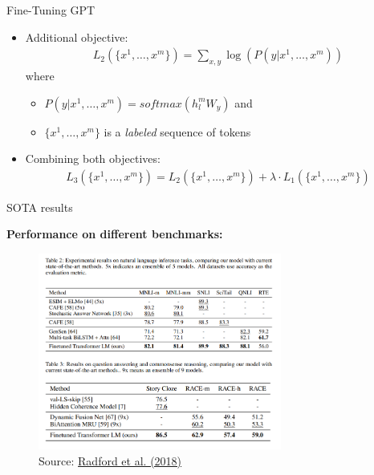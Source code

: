 
\begin{vbframe}{Fine-Tuning GPT}

\vfill

\begin{itemize}
		\item Additional objective:
					\begin{align*}
						L_2(\{x^1, \hdots, x^m\}) = \sum_{x,y} \log(P(y | x^1, \hdots, x^m))
					\end{align*}		
					where 
				\begin{itemize}
					\item $P(y | x^1, \hdots, x^m) = softmax(h_l^m W_y)$ and 
					\item $\{x^1, \hdots, x^m\}$ is a \textit{labeled} sequence of tokens
				\end{itemize}
		\item Combining both objectives: 
					\begin{align*}
						L_3(\{x^1, \hdots, x^m\}) = L_2(\{x^1, \hdots, x^m\}) + \lambda \cdot L_1(\{x^1, \hdots, x^m\})
					\end{align*}
\end{itemize}

\vfill

\end{vbframe}


\begin{vbframe}{SOTA results}

\vfill

	\textbf{Performance on different benchmarks:}

	\begin{figure}
		\centering
		\includegraphics[width = 8cm]{figure/gpt-sota.png}\\ 
		\footnotesize{Source:} \href{https://s3-us-west-2.amazonaws.com/openai-assets/research-covers/language-unsupervised/language_understanding_paper.pdf}{\footnotesize Radford et al. (2018)}
	\end{figure}

\vfill

\end{vbframe}


\endlecture

